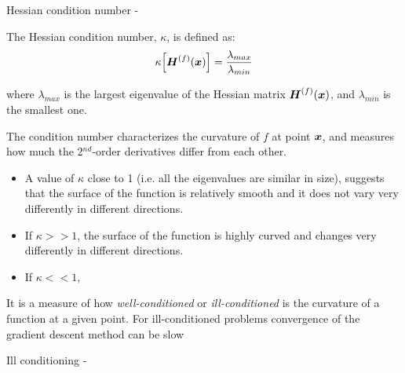 \begin{frame}[t,allowframebreaks]{Hessian condition number -}

    The \gls{Hessian condition number}, 
    $\kappa$, is defined as:
    \begin{equation}
        \kappa \Bigl[ \boldsymbol{H}^{(f)}(\boldsymbol{x}) \Bigr] 
          = \frac{\lambda_{max}}{\lambda_{min}}
        \label{eq:hessian_condition_number_1}
    \end{equation}

    where $\lambda_{max}$ is the largest 
    \gls{eigenvalue} 
    of the \gls{Hessian matrix} 
    $\boldsymbol{H}^{(f)}(\boldsymbol{x})$, and  $\lambda_{min}$ 
    is the smallest one.\\
    
    \vspace{0.2cm}

    The \gls{condition number} characterizes 
    the curvature of $f$ at point $\boldsymbol{x}$, and measures
    how much the 2$^{nd}$-order derivatives differ from each other.

    \begin{itemize}
        \item
        A value of $\kappa$ close to 1 (i.e. all the \glspl{eigenvalue} are similar in size), 
        suggests that the surface of the function 
        is relatively smooth and it does not vary very differently in different directions.
        \item
        If $\kappa >> 1$, the surface of the function is highly curved
        and changes very differently in different directions.
        \item
        If $\kappa << 1$,
    \end{itemize}

    It is a measure of how {\em well-conditioned} or 
    {\em ill-conditioned} is the curvature of a function at a given point.
    For ill-conditioned problems convergence of the 
    \gls{gradient descent} method can be slow\\


\end{frame}

\begin{frame}[t,allowframebreaks]{Ill conditioning -}

\end{frame}

